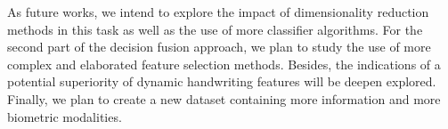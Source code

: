 \documentclass[conference]{IEEEtran}
\begin{document}
As future works, we intend to explore the impact of dimensionality reduction methods in this task as well as the use of more classifier algorithms. For the second part of the decision fusion approach, we plan to study the use of more complex and elaborated feature selection methods. Besides, the indications of a potential superiority of dynamic handwriting features will be deepen explored.
Finally, we plan to create a new dataset containing more information and more biometric modalities.
 
 


\end{document}
